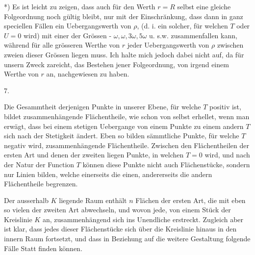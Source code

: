 \documentclass[10pt]{article}
\begin{document}
*) Es ist leicht zu zeigen, dass auch für den Werth \(r=R\) selbst eine gleiche Folgeordnung noch gültig bleibt, nur mit der Einschrănkung, dass dann in ganz speciellen Fällen ein Uebergangswerth von \(\rho\), (d. i. ein solcher, für welchen \(T\) oder \(U=0\) wird) mit einer der Grössen - \(\omega, \omega, 3 \omega, 5 \omega\) u. s.w. zusammenfallen kann, während für alle grösseren Werthe von \(r\) jeder Uebergangswerth von \(\rho\) zwischen zweien dieser Grössen liegen muss. Ich halte mich jedoch dabei nicht auf, da für unsern Zweck zareicht, das Bestehen jener Folgeordnung, von irgend einem Werthe von \(r\) an, nachgewiesen zu haben.

7.

Die Gesammtheit derjenigen Punkte in unserer Ebene, für welche \(T\) positiv ist, bildet zusammenhängende Flächentheile, wie schon von selbst erhellet, wenn man erwägt, dass bei einem stetigen Uebergange von einem Punkte zu einem andern \(T\) sich nach der Stetigkeit ändert. Eben so bilden sämmtliche Punkte, für welche \(T\) negativ wird, zusammenhängende Flächentheile. Zwischen den Flächentheilen der ersten Art und denen der zweiten liegen Punkte, in welchen \(T=0\) wird, und nach der Natur der Function \(T\) können diese Punkte nicht auch Flächenstücke, sondern nur Linien bilden, welche einerseits die einen, andererseits die andern Flächentheile begrenzen.

Der ausserhalb \(K\) liegende Raum enthält \(n\) Flächen der ersten Art, die mit eben so vielen der zweiten Art abwechseln, und wovon jede, von einem Stück der Kreislinie \(K\) an, zusammenhängend sich ins Unendliche erstreckt. Zugleich aber ist klar, dass jedes dieser Flächenstücke sich über die Kreislinie hinaus in den innern Raum fortsetzt, und dass in Beziehung auf die weitere Gestaltung folgende Fälle Statt finden können.
\end{document}

